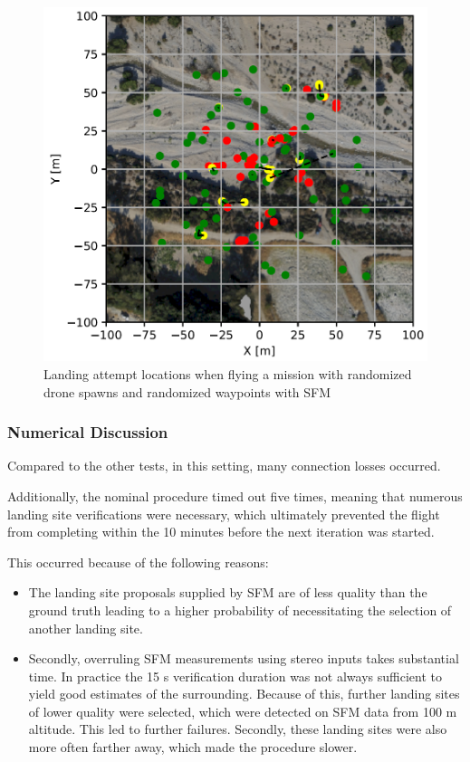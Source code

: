     \begin{figure}[h]
    \centering
    \includegraphics[scale=0.45]{images/evaluation/landing_SFM.png}
    \caption{Landing attempt locations when flying a mission with randomized drone spawns and randomized waypoints with SFM}
    \label{fig:land_SFM} 
    \end{figure}


    \subsubsection{Numerical Discussion}
    Compared to the other tests, in this setting, many connection losses occurred. 
    
    Additionally, the nominal procedure timed out five times, meaning that numerous landing site verifications were necessary, which ultimately prevented the flight from completing within the 10 minutes before the next iteration was started. 

    This occurred because of the following reasons:

    \begin{itemize}
        \item The landing site proposals supplied by SFM are of less quality than the ground truth leading to a higher probability of necessitating the selection of another landing site. 
        \item Secondly, overruling SFM measurements using stereo inputs takes substantial time. In practice the 15 s verification duration was not always sufficient to yield good estimates of the surrounding. Because of this, further landing sites of lower quality were selected, which were detected on SFM data from 100 m altitude. This led to further failures. Secondly, these landing sites were also more often farther away, which made the procedure slower.
    \end{itemize}

